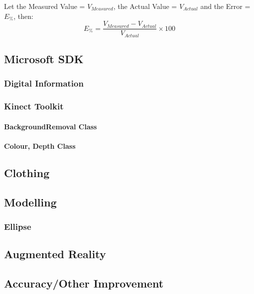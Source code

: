 Let the Measured Value = $V_{Measured}$, the Actual Value = $V_{Actual}$ and the Error = $E_\%$, then:\\
\begin{equation} \label{eq: measurementAcc}
E_\% = \frac{V_{Measured} - V_{Actual}}{V_{Actual}} \times 100
\end{equation} 


\subsection{Microsoft SDK}

\subsubsection{Digital Information}

\subsubsection{Kinect Toolkit}

\paragraph{BackgroundRemoval Class}

\paragraph{Colour, Depth Class}


\subsection{Clothing}



\subsection{Modelling}

\subsubsection{Ellipse}




\subsection{Augmented Reality}


\subsection{Accuracy/Other Improvement }